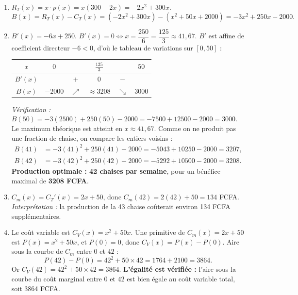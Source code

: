 \documentclass[11pt]{article}
\begin{document}
\begin{corrige}
\begin{enumerate}
    \item $R_T(x) = x \cdot p(x) = x(300 - 2x) = -2x^2 + 300x$.
    \[ B(x) = R_T(x) - C_T(x) = (-2x^2 + 300x) - (x^2 + 50x + 2000) = -3x^2 + 250x - 2000. \]
    \item $B'(x) = -6x + 250$. \quad $B'(x) = 0 \Leftrightarrow x = \dfrac{250}{6} = \dfrac{125}{3} \approx 41,67$.
    $B'$ est affine de coefficient directeur $-6 < 0$, d'où le tableau de variations sur $[0, 50]$ :
    \begin{center}
    \begin{tabular}{|c|ccccc|}\hline
    $x$ & $0$ & & $\frac{125}{3}$ & & $50$ \\ \hline
    $B'(x)$ & & $+$ & $0$ & $-$ & \\ \hline
    $B(x)$ & $-2000$ & $\nearrow$ & $\approx 3208$ & $\searrow$ & $3000$ \\ \hline
    \end{tabular}
    \end{center}
    \emph{Vérification :} $B(50) = -3(2500) + 250(50) - 2000 = -7500 + 12500 - 2000 = 3000$.
    Le maximum théorique est atteint en $x \approx 41,67$. Comme on ne produit pas une fraction de chaise, on compare les entiers voisins :
    \begin{align*}
    B(41) &= -3(41)^2 + 250(41) - 2000 = -5043 + 10250 - 2000 = 3207, \\
    B(42) &= -3(42)^2 + 250(42) - 2000 = -5292 + 10500 - 2000 = 3208.
    \end{align*}
    \textbf{Production optimale : 42 chaises par semaine}, pour un bénéfice maximal de \textbf{3208 FCFA}.
    \item $C_m(x) = C_T'(x) = 2x + 50$, donc $C_m(42) = 2(42) + 50 = 134$ FCFA.
    \emph{Interprétation :} la production de la 43 chaise coûterait environ 134 FCFA supplémentaires.
    \item Le coût variable est $C_V(x) = x^2 + 50x$. Une primitive de $C_m(x) = 2x + 50$ est $P(x) = x^2 + 50x$, et $P(0) = 0$, donc $C_V(x) = P(x) - P(0)$.
    Aire sous la courbe de $C_m$ entre $0$ et $42$ :
    \[ P(42) - P(0) = 42^2 + 50 \times 42 = 1764 + 2100 = 3864. \]
    Or $C_V(42) = 42^2 + 50 \times 42 = 3864$. \textbf{L'égalité est vérifiée :} l'aire sous la courbe du coût marginal entre $0$ et $42$ est bien égale au coût variable total, soit 3864 FCFA.
\end{enumerate}
\end{corrige}
\end{document}
